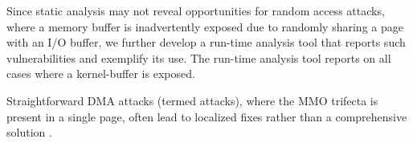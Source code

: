 
Since static analysis may not reveal opportunities for random access attacks, where a memory buffer is inadvertently exposed due to randomly sharing a page with an I/O buffer, we further develop a run-time analysis tool that reports such vulnerabilities and exemplify its use. The run-time analysis tool reports on all cases where a kernel-buffer is exposed. 



Straightforward DMA attacks (termed \simple attacks), where the MMO trifecta is present in a single page, often lead to localized fixes rather than a comprehensive solution \cite{thunder}.

